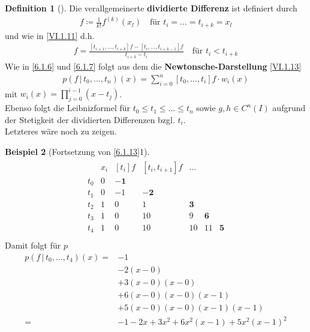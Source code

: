\documentclass[ngerman,fontsize=11pt, paper=a4, parskip=half, titlepage=true, toc=bib]{scrbook}
\theoremstyle{definition}
\newtheorem{Def}{Definition}[section]		%
\newtheorem{Bsp}[Def]{Beispiel}
\theoremstyle{plain}
\newenvironment{Bspe}[1][]{ %
  \begin{Bsp}[#1]}
  {\end{Bsp}
  	\addtocounter{subsection}{1}}
\newenvironment{Defe}[1][]{ %
  \begin{Def}[#1]}
  {\end{Def}
  	\addtocounter{subsection}{1}}
\begin{document}
\begin{Defe}
  Die verallgemeinerte \textbf{dividierte Differenz}
ist definiert durch 
\begin{gather*}
  [t_i,\dots, t_{i+k}]f \coloneqq \frac{1}{k!} f^{(k)}(x_l)
\quad \text{für } t_i=\dots = t_{i+k}=x_l %
\end{gather*}
und wie in \eqref{VI.1.11} d.h.
\begin{gather*}
  [t_i,\dots, t_{i+k}]f = \frac{[t_{i+1},\dots, t_{i+k}]f
                                - [t_i,\dots,t_{i+k-1}]f}
                              {t_{i+k}-t_i}
\quad \text{für } t_i<t_{i+k}
\end{gather*}
Wie in \ref{6.1.6} und \ref{6.1.7} folgt aus dem 
die \textbf{Newtonsche-Darstellung} \eqref{VI.1.13}
\begin{gather*}
  p(f\,|\, t_0,\dots, t_{n})(x) = \sum_{i=0}^{n}[t_0,\dots,t_i]f\cdot w_i(x) 
\end{gather*}
mit $w_i(x) =\prod_{j=0}^{i-1}(x-t_j)$.\\
Ebenso folgt die Leibnizformel für $t_0\leq t_1\leq\dots\leq t_n$
sowie $g,h\in C^n(I)$ aufgrund der Stetigkeit
 der dividierten Differenzen bzgl. $t_i$.\\
Letzteres wäre noch zu zeigen.
\end{Defe}


\begin{Bspe}[Fortsetzung von \ref{6.1.13}1]\label{6.1.16}
  \begin{align*}
    \begin{array}{ccccccc}
      &   x_i& [t_i]f & [t_i,t_{i+1}]f &\dots \\
      t_0 &0 & \boldsymbol{-1} \\
      t_1 &0 & -1 & \boldsymbol{-2}\\ 
      t_2 &1 & 0  & 1  &\boldsymbol{3} \\
      t_3 &1 & 0  & 10 &9  &\boldsymbol{6} \\
      t_4 &1 & 0  & 10 &10 &11 & \boldsymbol{5}
    \end{array}\\
  \end{align*}
  Damit folgt für $p$
  \begin{align*}
    p(f\,|\,t_0,\dots, t_4)(x) 
    =& -1\\
	  &-2(x-0)\\
     & +3(x-0)(x-0)\\
     & +6(x-0)(x-0)(x-1)\\
     & +5(x-0)(x-0)(x-1)(x-1)\\
    =&-1-2x+3x^2+6x^2(x-1)+5x^2(x-1)^2
  \end{align*}
\end{Bspe}
\end{document}
